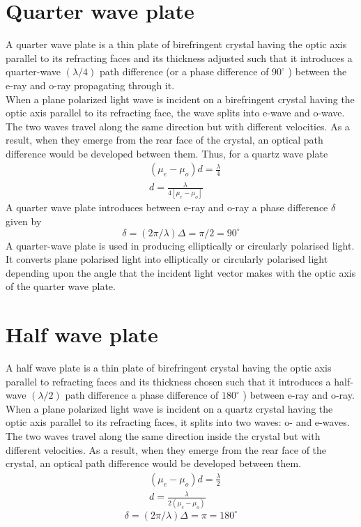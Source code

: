 \section{Quarter wave plate}
A quarter wave plate is a thin plate of birefringent crystal having the optic axis parallel to its refracting faces and its thickness adjusted such that it introduces a quarter-wave $(\lambda / 4)$ path difference (or a phase difference of $90^{\circ}$ ) between the e-ray and o-ray propagating through it.\\
When a plane polarized light wave is incident on a birefringent crystal having the optic axis parallel to its refracting face, the wave splits into e-wave and o-wave. The two waves travel along the same direction but with different velocities. As a result, when they emerge from the rear face of the crystal, an optical path difference would be developed between them. Thus, for a quartz wave plate\\
$$
\begin{aligned}
&\left(\mu_{e}-\mu_{o}\right) d=\frac{\lambda}{4} \\
&d=\frac{\lambda}{4\left[\mu_{e}-\mu_{o}\right]}
\end{aligned}
$$
A quarter wave plate introduces between e-ray and o-ray a phase difference $\delta$ given by
$$
\delta=(2 \pi / \lambda) \Delta=\pi / 2=90^{\circ}
$$
A quarter-wave plate is used in producing elliptically or circularly polarised light. It converts plane polarised light into elliptically or circularly polarised light depending upon the angle that the incident light vector makes with the optic axis of the quarter wave plate.
\section{Half wave plate}
A half wave plate is a thin plate of birefringent crystal having the optic axis parallel to refracting faces and its thickness chosen such that it introduces a half-wave $(\lambda / 2)$ path difference a phase difference of $180^{\circ}$ ) between e-ray and o-ray.\\
When a plane polarized light wave is incident on a quartz crystal having the optic axis parallel to its refracting faces, it splits into two waves: o- and e-waves. The two waves travel along the same direction inside the crystal but with different velocities. As a result, when they emerge from the rear face of the crystal, an optical path difference would be developed between them.\\
$$\begin{aligned}
	&\left(\mu_{e}-\mu_{o}\right) d=\frac{\lambda}{2} \\
	&d=\frac{\lambda}{2\left(\mu_{e}-\mu_{o}\right)}
\end{aligned}$$
$$\delta=(2 \pi / \lambda) \Delta=\pi=180^{\circ}$$

